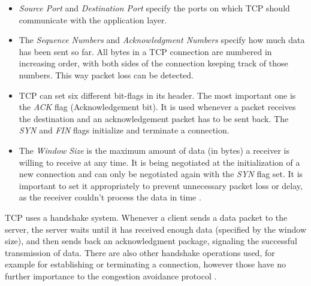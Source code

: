 \documentclass[a4paper,conference]{IEEEtran}
\begin{document}
\begin{itemize}
\item \textit{Source Port} and \textit{Destination Port} specify the ports on which TCP should communicate with the application layer.

\item The \textit{Sequence Numbers} and \textit{Acknowledgment Numbers} specify how much data has been sent so far. All bytes in a TCP connection are numbered in increasing order, with both sides of the connection keeping track of those numbers. This way packet loss can be detected.

\item TCP can set six different bit-flags in its header. The most important one is the \textit{ACK} flag (Acknowledgement bit). It is used whenever a packet receives the destination and an acknowledgement packet has to be sent back. The \textit{SYN} and \textit{FIN} flags initialize and terminate a connection.

\item The \textit{Window Size} is the maximum amount of data (in bytes) a receiver is willing to receive at any time. It is being negotiated at the initialization of a new connection and can only be negotiated again with the \textit{SYN} flag set. It is important to set it appropriately to prevent unnecessary packet loss or delay, as the receiver couldn't process the data in time \cite{jacobson1992tcp}.
\end{itemize}
TCP uses a handshake system. Whenever a client sends a data packet to the server, the server waits until it has received enough data (specified by the window size), and then sends back an acknowledgment package, signaling the successful transmission of data. There are also other handshake operations used, for example for establishing or terminating a connection, however those have no further importance to the congestion avoidance protocol \cite{1209197,jacobson1992tcp,huston2000tcp,jacobson1995congestion}.
\end{document}
